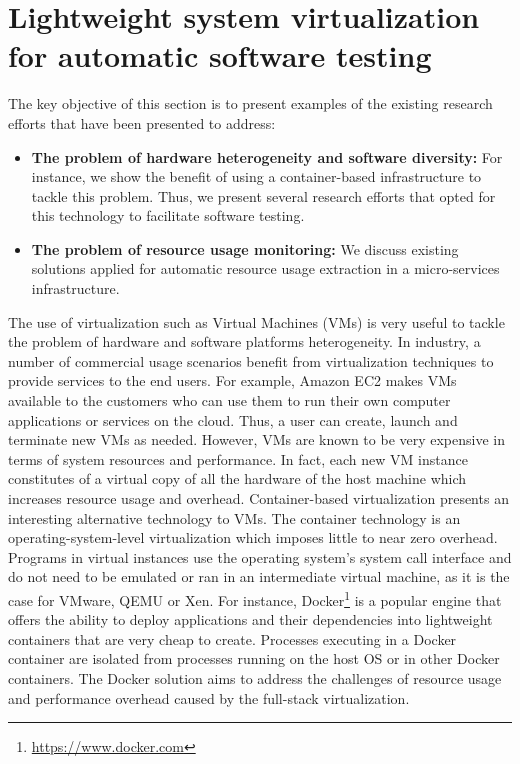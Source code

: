 \section{Lightweight system virtualization for automatic software testing}
\label{sec:Lightweight system virtualization for software testing}

The key objective of this section is to present examples of the existing research efforts that have been presented to address:
\begin{itemize}
	\item \textbf{The problem of hardware heterogeneity and software diversity:} For instance, we show the benefit of using a container-based infrastructure to tackle this problem. Thus, we present several research efforts that opted for this technology to facilitate software testing. 
	
	\item \textbf{The problem of resource usage monitoring:} We discuss existing solutions applied for automatic resource usage extraction in a micro-services infrastructure. 
\end{itemize}


The use of virtualization such as Virtual Machines (VMs) is very useful to tackle the problem of hardware and software platforms heterogeneity.
In industry, a number of commercial usage scenarios benefit from virtualization techniques to provide services to the end users. For example, Amazon EC2 makes VMs available to the customers who can use them to run their own computer applications or services on the cloud. Thus, a user can create, launch and terminate new VMs as needed.  
However, VMs are known to be very expensive in terms of system resources and performance. In fact, each new VM instance constitutes of a virtual copy of all the hardware of the host machine which increases resource usage and overhead\cite{merkel2014docker}. 
Container-based virtualization presents an interesting alternative technology to VMs. The container technology is an operating-system-level virtualization which imposes little to near zero overhead. Programs in virtual instances use the operating system's system call interface and do not need to be emulated or ran in an intermediate virtual machine, as it is the case for VMware, QEMU or Xen.
For instance, Docker\footnote{\url{https://www.docker.com}} is a popular engine that offers the ability to deploy applications and their dependencies into lightweight containers that are very cheap to create. Processes executing in a Docker container are isolated from processes running on the host OS or in other Docker containers. The Docker solution aims to address the challenges of resource usage and performance overhead caused by the full-stack virtualization. 

